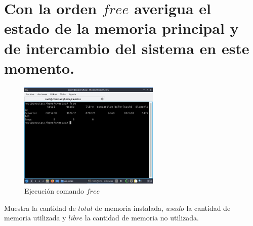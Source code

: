 \documentclass[12pt]{article}
\begin{document}
\section{Con la orden $free$ averigua el estado de la memoria
principal y de intercambio del sistema en este momento.}

\begin{figure}[h]
    \centering
    \includegraphics[width=0.6\textwidth]{images/screenB14.jpg}
    \caption{Ejecución comando $free$}
\end{figure}

Muestra la cantidad de $total$ de memoria instalada, $usado$ la cantidad de memoria utilizada y $libre$ la cantidad de memoria no utilizada.
\end{document}
